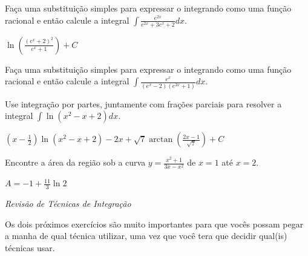 \begin{exercises}
\begin{exercise}
Faça uma substituição simples para expressar o integrando como uma função
racional e então calcule a integral \(\int \frac{e^{2x}}{e^{2x}+3e^x+2}dx\).
\begin{answer}
  $\ln \left( \frac{(e^x+2)^2}{e^x+1} \right)+ C$
\end{answer}
\end{exercise}

\begin{exercise}
Faça uma substituição simples para expressar o integrando como uma função
racional e então calcule a integral \(\int \frac{e^{x}}{(e^x-2)(e^{2x}+1)}dx\).
\end{exercise}

\begin{exercise}
  Use integração por partes, juntamente com frações parciais para resolver a
  integral $\int \ln(x^2-x+2)dx$.
\begin{answer}
  $(x-\frac{1}{2})\ln(x^2-x+2)-2x+\sqrt{7} \arctan
  \left(\frac{2x-1}{\sqrt{7}}\right)+C$
\end{answer}
\end{exercise}

\begin{exercise}
  Encontre a área da região sob a curva
  $y=\frac{x^2+1}{3x-x^2}$ de $x=1$ até $x=2$.
\begin{answer}
$ A = -1 + \frac{11}{3} \ln 2 $
\end{answer}
\end{exercise}

\emph{Revisão de Técnicas de Integração}

Os dois próximos exercícios são muito importantes para que vocês possam pegar a
manha de qual técnica utilizar, uma vez que você tera que decidir qual(is)
técnicas usar.


\end{exercises}
